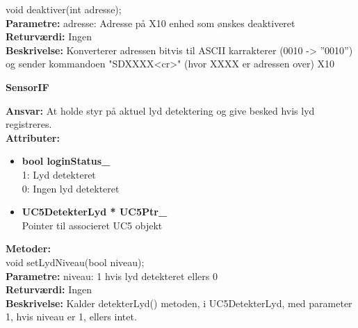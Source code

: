 void deaktiver(int adresse); \\
\textbf{Parametre:} adresse: Adresse på X10 enhed som ønskes deaktiveret \\
\textbf{Returværdi:} Ingen \\
\textbf{Beskrivelse:} Konverterer adressen bitvis til ASCII karrakterer (0010 -> ''0010'') og sender kommandoen "SDXXXX<cr>" (hvor XXXX er adressen over) X10 \\

%
%
{\centering
\textbf{SensorIF}\par
}
\textbf{Ansvar:} At holde styr på aktuel lyd detektering og give besked hvis lyd registreres. \\
\textbf{Attributer:}
\begin{itemize}
	\item \textbf{bool loginStatus\_} \\
	1: Lyd detekteret \\
	0: Ingen lyd detekteret
	\item \textbf{UC5DetekterLyd * UC5Ptr\_} \\
	Pointer til associeret UC5 objekt
\end{itemize}

\textbf{Metoder:} \\
void setLydNiveau(bool niveau); \\
\textbf{Parametre:} niveau: 1 hvis lyd detekteret ellers 0 \\
\textbf{Returværdi:} Ingen \\
\textbf{Beskrivelse:} Kalder detekterLyd() metoden, i UC5DetekterLyd, med parameter 1, hvis niveau er 1, ellers intet. \\

